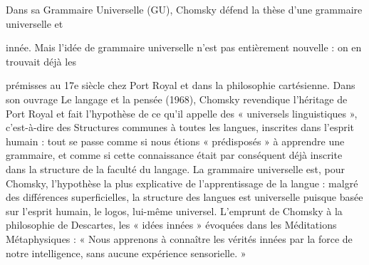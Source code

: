 
Dans sa Grammaire Universelle (GU), Chomsky défend la thèse d’une grammaire universelle et

innée. Mais l'idée de grammaire universelle n’est pas entièrement nouvelle : on en trouvait déjà les

prémisses au 17e siècle chez Port Royal et dans la philosophie cartésienne.
Dans son ouvrage Le langage et la pensée (1968), Chomsky revendique l'héritage de Port
Royal et fait l'hypothèse de ce qu’il appelle des « universels linguistiques », c'est-à-dire des
Structures communes à toutes les langues, inscrites dans l’esprit humain : tout se passe comme
si nous étions « prédisposés » à apprendre une grammaire, et comme si cette connaissance
était par conséquent déjà inscrite dans la structure de la faculté du langage. La grammaire
universelle est, pour Chomsky, l'hypothèse la plus explicative de l'apprentissage de la langue :
malgré des différences superficielles, la structure des langues est universelle puisque basée sur
l'esprit humain, le logos, lui-même universel.
L'emprunt de Chomsky à la philosophie de Descartes, les « idées innées » évoquées dans les
Méditations Métaphysiques : « Nous apprenons à connaître les vérités innées par la force de
notre intelligence, sans aucune expérience sensorielle. »


